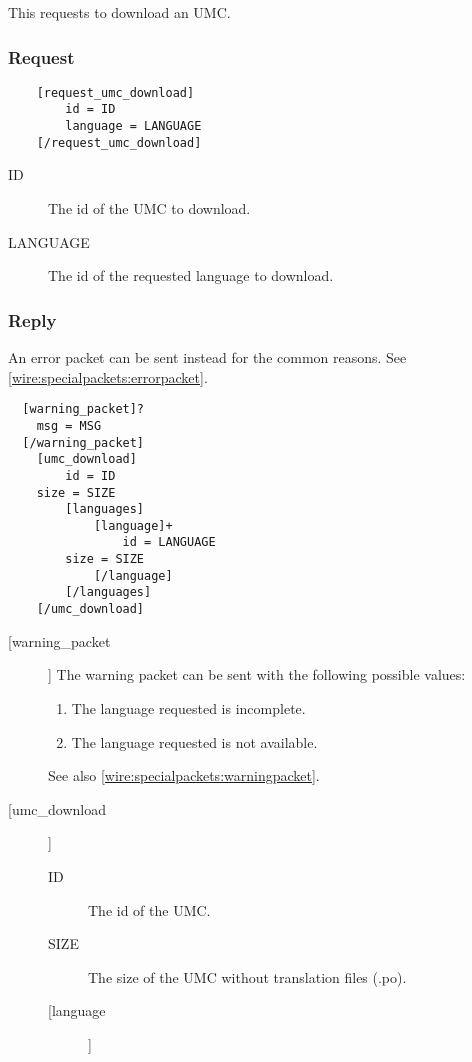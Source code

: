 This requests to download an UMC.

\subsubsection{Request}
\begin{lstlisting}
	[request_umc_download]
		id = ID
		language = LANGUAGE
	[/request_umc_download]
\end{lstlisting}

\begin{description}
\item[ID]
	The id of the UMC to download.

\item[LANGUAGE]
	The id of the requested language to download.

\end{description}

\subsubsection{Reply}

An error packet can be sent instead for the common reasons. See \cref{wire:specialpackets:errorpacket}.

\begin{lstlisting}
  [warning_packet]?
    msg = MSG
  [/warning_packet]
	[umc_download]
		id = ID
    size = SIZE
		[languages]
			[language]+
				id = LANGUAGE
        size = SIZE
			[/language]
		[/languages]
	[/umc_download]
\end{lstlisting}

\begin{description}
 \item [[warning\_packet]]
    The warning packet can be sent with the following possible values:
    \begin{enumerate}
      \item The language requested is incomplete.
      \item The language requested is not available.
    \end{enumerate}
    See also \cref{wire:specialpackets:warningpacket}.
  \item[[umc\_download]]
  \begin{description}
    \item [ID] The id of the UMC.
    \item [SIZE] The size of the UMC without translation files (.po).
    \item [[language]]
  \end{description}
\end{description}


